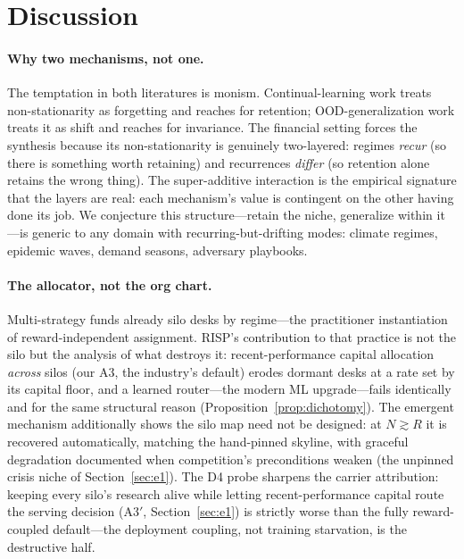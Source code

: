 \documentclass{article}
\newcommand{\nm}{\textsc{RISP}}
\begin{document}
\section{Discussion}

\paragraph{Why two mechanisms, not one.} The temptation in both
literatures is monism. Continual-learning work treats non-stationarity as
forgetting and reaches for retention; OOD-generalization work treats it as
shift and reaches for invariance. The financial setting forces the
synthesis because its non-stationarity is genuinely two-layered: regimes
\emph{recur} (so there is something worth retaining) and recurrences
\emph{differ} (so retention alone retains the wrong thing). The
super-additive interaction is the empirical signature that the layers are
real: each mechanism's value is contingent on the other having done its
job. We conjecture this structure---retain the niche, generalize within
it---is generic to any domain with recurring-but-drifting modes: climate
regimes, epidemic waves, demand seasons, adversary playbooks.

\paragraph{The allocator, not the org chart.} Multi-strategy funds already
silo desks by regime---the practitioner instantiation of
reward-independent assignment. \nm{}'s contribution to that practice is
not the silo but the analysis of what destroys it: recent-performance
capital allocation \emph{across} silos (our A3, the industry's default)
erodes dormant desks at a rate set by its capital floor, and a learned
router---the modern ML upgrade---fails identically and for the same
structural reason (Proposition~\ref{prop:dichotomy}). The emergent
mechanism additionally shows the silo map need not be designed: at
$N \gtrsim R$ it is recovered automatically, matching the hand-pinned
skyline, with graceful degradation documented when competition's
preconditions weaken (the unpinned crisis niche of Section~\ref{sec:e1}).
The D4 probe sharpens the carrier attribution: keeping every silo's
research alive while letting recent-performance capital route the
serving decision (A3$'$, Section~\ref{sec:e1}) is strictly worse than
the fully reward-coupled default---the deployment coupling, not
training starvation, is the destructive half.
\end{document}
